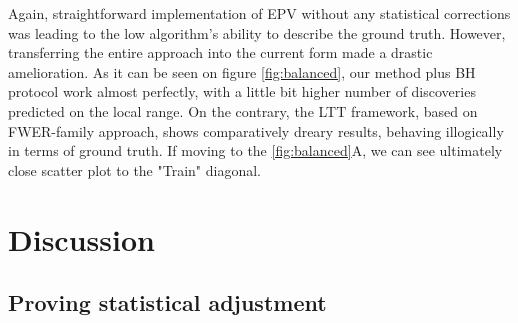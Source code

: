\documentclass{article}
\begin{document}
Again, straightforward implementation of EPV without any statistical corrections was leading to the low algorithm's ability to describe the ground truth. However, transferring the entire approach into the current form made a drastic amelioration. As it can be seen on figure \ref{fig:balanced}, our method plus BH protocol work almost perfectly, with a little bit higher number of discoveries predicted on the local range. On the contrary, the LTT framework, based on FWER-family approach, shows comparatively dreary results, behaving illogically in terms of ground truth. If moving to the \ref{fig:balanced}A, we can see ultimately close scatter plot to the "Train" diagonal.

\section{Discussion}

\subsection{Proving statistical adjustment}
\end{document}
